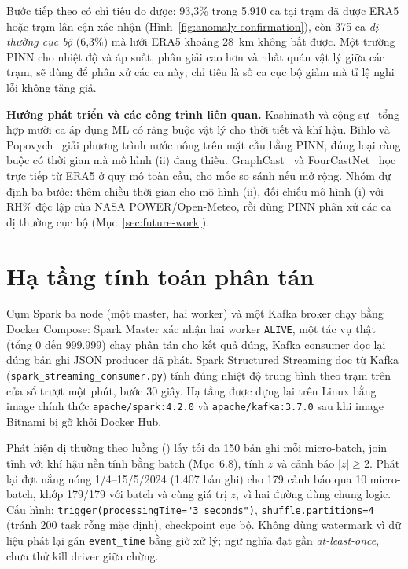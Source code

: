 \documentclass[12pt,a4paper]{report}
\begin{document}
Bước tiếp theo có chỉ tiêu đo được: 93,3\% trong 5.910 ca tại trạm đã được ERA5 hoặc trạm lân cận xác nhận
(Hình~\ref{fig:anomaly-confirmation}), còn 375 ca \emph{dị thường cục bộ} (6,3\%) mà lưới ERA5 khoảng 28~km
không bắt được. Một trường PINN cho nhiệt độ và áp suất, phân giải cao hơn và nhất quán vật lý giữa các trạm,
sẽ dùng để phân xử các ca này; chỉ tiêu là số ca cục bộ giảm mà tỉ lệ nghi lỗi không tăng giả.

\textbf{Hướng phát triển và các công trình liên quan.} Kashinath và cộng sự~\cite{kashinath2021physics}
tổng hợp mười ca áp dụng ML có ràng buộc vật lý cho thời tiết và khí hậu. Bihlo và
Popovych~\cite{bihlo2022pinn} giải phương trình nước nông trên mặt cầu bằng PINN, đúng loại ràng
buộc có thời gian mà mô hình (ii) đang thiếu. GraphCast~\cite{lam2023graphcast} và
FourCastNet~\cite{pathak2022fourcastnet} học trực tiếp từ ERA5 ở quy mô toàn cầu, cho mốc so sánh
nếu mở rộng. Nhóm dự định ba bước: thêm chiều thời gian cho mô hình (ii), đối chiếu mô hình (i) với
RH\% độc lập của NASA POWER/Open-Meteo, rồi dùng PINN phân xử các ca dị thường cục bộ (Mục~\ref{sec:future-work}).

\section{Hạ tầng tính toán phân tán}

Cụm Spark ba node (một master, hai worker) và một Kafka broker chạy bằng Docker Compose: Spark Master
xác nhận hai worker \texttt{ALIVE}, một tác vụ thật (tổng 0 đến 999.999) chạy phân tán cho kết quả
đúng, Kafka consumer đọc lại đúng bản ghi JSON producer đã phát. Spark Structured Streaming đọc từ
Kafka (\texttt{spark\_streaming\_consumer.py}) tính đúng nhiệt độ trung bình theo trạm trên cửa sổ
trượt một phút, bước 30 giây. Hạ tầng được dựng lại trên Linux bằng image chính thức
\texttt{apache/spark:4.2.0} và \texttt{apache/kafka:3.7.0} sau khi image Bitnami bị gỡ khỏi Docker Hub.

Phát hiện dị thường theo luồng () lấy tối đa 150 bản ghi mỗi
micro-batch, join tĩnh với khí hậu nền tính bằng batch (Mục~6.8), tính $z$ và cảnh báo $|z| \ge 2$.
Phát lại đợt nắng nóng 1/4--15/5/2024 (1.407 bản ghi) cho 179 cảnh báo qua 10 micro-batch, khớp 179/179
với batch và cùng giá trị $z$, vì hai đường dùng chung logic. Cấu hình:
\texttt{trigger(processingTime="3 seconds")}, \texttt{shuffle.partitions=4} (tránh 200 task rỗng mặc
định), checkpoint cục bộ. Không dùng watermark vì dữ liệu phát lại gán \texttt{event\_time} bằng giờ xử
lý; ngữ nghĩa đạt gần \emph{at-least-once}, chưa thử kill driver giữa chừng.
\end{document}
